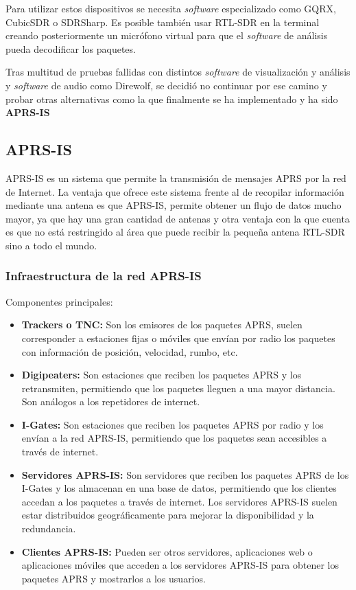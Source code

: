 Para utilizar estos dispositivos se necesita \textit{software} especializado como GQRX, CubicSDR o SDRSharp. Es posible también usar RTL-SDR en la terminal creando posteriormente un micrófono virtual para que el \textit{software} de análisis pueda decodificar los paquetes.

Tras multitud de pruebas fallidas con distintos \textit{software} de visualización y análisis y \textit{software} de audio como Direwolf, se decidió no continuar por ese camino y probar otras alternativas como la que finalmente se ha implementado y ha sido \textbf{APRS-IS}

\subsection{APRS-IS}
APRS-IS es un sistema que permite la transmisión de mensajes APRS por la red de Internet. La ventaja que ofrece este sistema frente al de recopilar información mediante una antena es que APRS-IS, permite obtener un flujo de datos mucho mayor, ya que hay una gran cantidad de antenas y otra ventaja con la que cuenta es que no está restringido al área que puede recibir la pequeña antena RTL-SDR sino a todo el mundo.

\subsubsection*{Infraestructura de la red APRS-IS}
Componentes principales:
\begin{itemize}
	\item \textbf{Trackers o TNC:} Son los emisores de los paquetes APRS, suelen corresponder a estaciones fijas o móviles que envían por radio los paquetes con información de posición, velocidad, rumbo, etc.
	\item \textbf{Digipeaters:} Son estaciones que reciben los paquetes APRS y los retransmiten, permitiendo que los paquetes lleguen a una mayor distancia. Son análogos a los repetidores de internet.
	\item \textbf{I-Gates:} Son estaciones que reciben los paquetes APRS por radio y los envían a la red APRS-IS, permitiendo que los paquetes sean accesibles a través de internet.
	\item \textbf{Servidores APRS-IS:} Son servidores que reciben los paquetes APRS de los I-Gates y los almacenan en una base de datos, permitiendo que los clientes accedan a los paquetes a través de internet. Los servidores APRS-IS suelen estar distribuidos geográficamente para mejorar la disponibilidad y la redundancia.
	\item \textbf{Clientes APRS-IS:} Pueden ser otros servidores, aplicaciones web o aplicaciones móviles que acceden a los servidores APRS-IS para obtener los paquetes APRS y mostrarlos a los usuarios.
\end{itemize}


